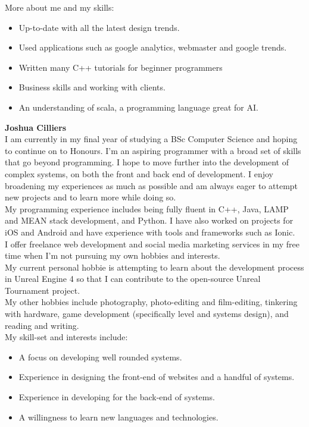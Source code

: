 	\noindent
	More about me and my skills:
    \begin{itemize}
        \item Up-to-date with all the latest design trends.
        \item Used applications such as google analytics, webmaster and google trends. 
        \item Written many C++ tutorials for beginner programmers
        \item Business skills and working with clients. 
        \item An understanding of scala, a programming language great for AI. 
    \end{itemize}
    
\textbf{Joshua Cilliers}\\
I am currently in my final year of studying a BSc Computer Science and hoping to continue on to Honours. I'm an aspiring programmer with a broad set of skills that go beyond programming. I hope to move further into the development of complex systems, on both the front and back end of development. I enjoy broadening my experiences as much as possible and am always eager to attempt new projects and to learn more while doing so.\\

My programming experience includes being fully fluent in C++, Java, LAMP and MEAN stack development, and Python. I have also worked on projects for iOS and Android and have experience with tools and frameworks such as Ionic.\\

I offer freelance web development and social media marketing services in my free time when I'm not pursuing my own hobbies and interests.\\

My current personal hobbie is attempting to learn about the development process in Unreal Engine 4 so that I can contribute to the open-source Unreal Tournament project.\\

My other hobbies include photography, photo-editing and film-editing, tinkering with hardware, game development (specifically level and systems design), and reading and writing.\\

My skill-set and interests include:
\begin{itemize}

        \item A focus on developing well rounded systems.
        
        \item Experience in designing the front-end of websites and a handful of systems.
        
        \item Experience in developing for the back-end of systems.
        
        \item A willingness to learn new languages and technologies.
        
    \end{itemize}

